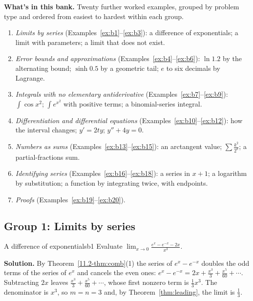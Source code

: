 \documentclass[11pt]{article}
\begin{document}
\textbf{What's in this bank.} Twenty further worked examples, grouped by problem type and ordered from easiest to hardest within each group.
\begin{enumerate}[nosep]
  \item \emph{Limits by series} (Examples~\ref{ex:b1}--\ref{ex:b3}): a difference of exponentials; a limit with parameters; a limit that does not exist.
  \item \emph{Error bounds and approximations} (Examples~\ref{ex:b4}--\ref{ex:b6}): $\ln1.2$ by the alternating bound; $\sinh0.5$ by a geometric tail; $e$ to six decimals by Lagrange.
  \item \emph{Integrals with no elementary antiderivative} (Examples~\ref{ex:b7}--\ref{ex:b9}): $\int\cos x^2$; $\int e^{x^2}$ with positive terms; a binomial-series integral.
  \item \emph{Differentiation and differential equations} (Examples~\ref{ex:b10}--\ref{ex:b12}): how the interval changes; $y'=2ty$; $y''+4y=0$.
  \item \emph{Numbers as sums} (Examples~\ref{ex:b13}--\ref{ex:b15}): an arctangent value; $\sum\frac{k^2}{2^k}$; a partial-fractions sum.
  \item \emph{Identifying series} (Examples~\ref{ex:b16}--\ref{ex:b18}): a series in $x+1$; a logarithm by substitution; a function by integrating twice, with endpoints.
  \item \emph{Proofs} (Examples~\ref{ex:b19}--\ref{ex:b20}).
\end{enumerate}

\subsection*{Group 1: Limits by series}

\begin{exmp}{A difference of exponentials}{b1}
Evaluate $\displaystyle\lim_{x\to0}\frac{e^x-e^{-x}-2x}{x^3}$.

\textbf{Solution.} By Theorem~\ref{11.2-thm:comb}(1) the series of $e^x-e^{-x}$ doubles the odd terms of the series of $e^x$ and cancels the even ones: $e^x-e^{-x}=2x+\frac{x^3}3+\frac{x^5}{60}+\cdots$. Subtracting $2x$ leaves $\frac{x^3}3+\frac{x^5}{60}+\cdots$, whose first nonzero term is $\frac13x^3$. The denominator is $x^3$, so $m=n=3$ and, by Theorem~\ref{thm:leading}, the limit is $\frac13$.
\end{exmp}
\end{document}
